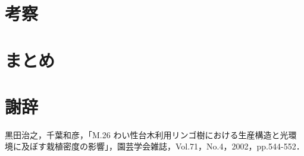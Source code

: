 \documentclass[a4paper]{jreport}	%
\begin{document}
\chapter{考察}

\chapter{まとめ}

\chapter*{謝辞}


\newpage
{}
\renewcommand{\bibname}{参考文献}

%
%

\begin{thebibliography}{99}

黒田治之，千葉和彦，「M.26 わい性台木利用リンゴ樹における生産構造と光環境に及ぼす栽植密度の影響」，園芸学会雑誌，Vol.71，No.4，2002，pp.544-552．
\end{thebibliography}
\end{document}
